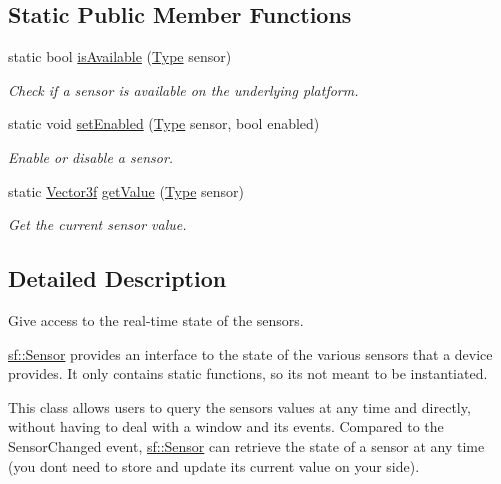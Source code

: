 \subsection*{Static Public Member Functions}
\begin{DoxyCompactItemize}
\item 
static bool \hyperlink{classsf_1_1_sensor_a7b7a2570218221781233bd495323abf0}{is\+Available} (\hyperlink{classsf_1_1_sensor_a687375af3ab77b818fca73735bcaea84}{Type} sensor)
\begin{DoxyCompactList}\small\item\em Check if a sensor is available on the underlying platform. \end{DoxyCompactList}\item 
static void \hyperlink{classsf_1_1_sensor_afb31c5697d2e0a5fec70d702ec1d6cd9}{set\+Enabled} (\hyperlink{classsf_1_1_sensor_a687375af3ab77b818fca73735bcaea84}{Type} sensor, bool enabled)
\begin{DoxyCompactList}\small\item\em Enable or disable a sensor. \end{DoxyCompactList}\item 
static \hyperlink{classsf_1_1_vector3}{Vector3f} \hyperlink{classsf_1_1_sensor_ab9a2710f55ead2f7b4e1b0bead34457e}{get\+Value} (\hyperlink{classsf_1_1_sensor_a687375af3ab77b818fca73735bcaea84}{Type} sensor)
\begin{DoxyCompactList}\small\item\em Get the current sensor value. \end{DoxyCompactList}\end{DoxyCompactItemize}


\subsection{Detailed Description}
Give access to the real-\/time state of the sensors. 

\hyperlink{classsf_1_1_sensor}{sf\+::\+Sensor} provides an interface to the state of the various sensors that a device provides. It only contains static functions, so it\textquotesingle{}s not meant to be instantiated.

This class allows users to query the sensors values at any time and directly, without having to deal with a window and its events. Compared to the Sensor\+Changed event, \hyperlink{classsf_1_1_sensor}{sf\+::\+Sensor} can retrieve the state of a sensor at any time (you don\textquotesingle{}t need to store and update its current value on your side).

